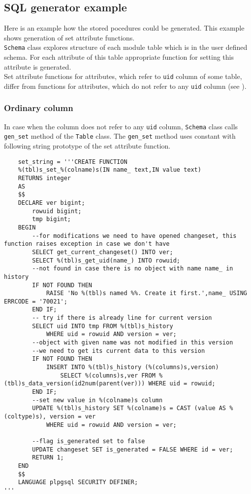 \documentclass[deska]{subfiles}
\begin{document}
\subsection{SQL generator example}
\label{sec:sql-gen-example}

Here is an example how the stored pocedures could be generated. This example shows generation of set attribute functions.\\

{\tt Schema} class explores structure of each module table which is in the user defined schema. For each attribute of this table appropriate function for setting this attribute is generated. \\
Set attribute functions for attributes, which refer to {\tt uid} column of some table, differ from functions for attributes, which do not refer to any {\tt uid} column (see ).

\subsubsection{Ordinary column}
In case when the column does not refer to any {\tt uid} column, {\tt Schema} class calls {\tt gen\_set} method of the {\tt Table} class. The {\tt gen\_set} method uses constant with following string prototype of the set attribute function.

\begin{verbatim}
    set_string = '''CREATE FUNCTION 
    %(tbl)s_set_%(colname)s(IN name_ text,IN value text)
    RETURNS integer
    AS
    $$
    DECLARE ver bigint;
        rowuid bigint;
        tmp bigint;
    BEGIN
        --for modifications we need to have opened changeset, this function raises exception in case we don't have
        SELECT get_current_changeset() INTO ver;
        SELECT %(tbl)s_get_uid(name_) INTO rowuid;
        --not found in case there is no object with name name_ in history
        IF NOT FOUND THEN
            RAISE 'No %(tbl)s named %%. Create it first.',name_ USING ERRCODE = '70021';
        END IF;
        -- try if there is already line for current version
        SELECT uid INTO tmp FROM %(tbl)s_history
            WHERE uid = rowuid AND version = ver;
        --object with given name was not modified in this version
        --we need to get its current data to this version
        IF NOT FOUND THEN
            INSERT INTO %(tbl)s_history (%(columns)s,version)
                SELECT %(columns)s,ver FROM %(tbl)s_data_version(id2num(parent(ver))) WHERE uid = rowuid;
        END IF;
        --set new value in %(colname)s column
        UPDATE %(tbl)s_history SET %(colname)s = CAST (value AS %(coltype)s), version = ver
            WHERE uid = rowuid AND version = ver;

        --flag is_generated set to false
        UPDATE changeset SET is_generated = FALSE WHERE id = ver;
        RETURN 1;
    END
    $$
    LANGUAGE plpgsql SECURITY DEFINER;
'''
\end{verbatim}
\end{document}
